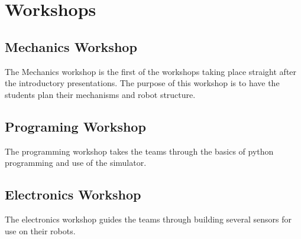 \section{Workshops}

\subsection{Mechanics Workshop}

The Mechanics workshop is the first of the workshops taking place straight after the introductory presentations.
The purpose of this workshop is to have the students plan their mechanisms and robot structure.


\subsection{Programing Workshop}

The programming workshop takes the teams through the basics of python programming and use of the simulator.



\subsection{Electronics Workshop}

The electronics workshop guides the teams through building several sensors for use on their robots.


